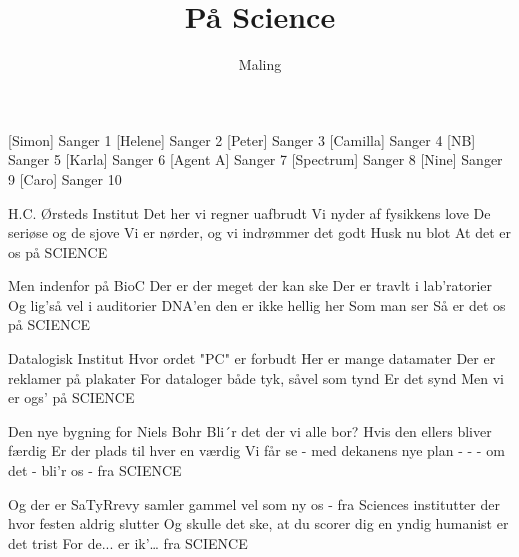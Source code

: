 \documentclass[a4paper,11pt]{article}
\title{På Science}
\author{Maling}
\begin{document}
\maketitle

\begin{roles}
[Simon] Sanger 1
[Helene] Sanger 2
[Peter] Sanger 3
[Camilla] Sanger 4
[NB] Sanger 5
[Karla] Sanger 6
[Agent A] Sanger 7
[Spectrum] Sanger 8
[Nine] Sanger 9
[Caro] Sanger 10
\end{roles}

\begin{song}

 H.C. Ørsteds Institut
Det her vi regner uafbrudt
Vi nyder af fysikkens love
De seriøse og de sjove
Vi er nørder, og vi indrømmer det godt
Husk nu blot
At det er os på SCIENCE

 Men indenfor på BioC
Der er der meget der kan ske
Der er travlt i lab’ratorier
Og lig’så vel i auditorier
DNA’en den er ikke hellig her
Som man ser
Så er det os på SCIENCE

 Datalogisk Institut
Hvor ordet "PC" er forbudt
Her er mange datamater
Der er reklamer på plakater
For dataloger både tyk, såvel som tynd
Er det synd
Men vi er ogs' på SCIENCE

 Den nye bygning for Niels Bohr
Bli´r det der vi alle bor?
Hvis den ellers bliver færdig
Er der plads til hver en værdig
Vi får se - med dekanens nye plan
- - -
om det - bli'r os - fra SCIENCE

 Og der er SaTyRrevy
samler gammel vel som ny
os - fra Sciences institutter
der hvor festen aldrig slutter
Og skulle det ske, at du scorer dig en yndig humanist
er det trist
For de... er ik'… fra SCIENCE

\end{song}
\end{document}
